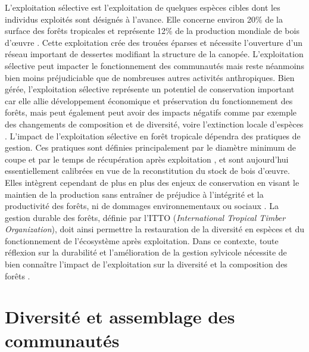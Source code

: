 \documentclass[
  11pt,
  french,
  A4paper,
  extrafontsizes,onecolumn,openright
  ]{memoir}
\begin{document}
L'exploitation sélective est l'exploitation de quelques espèces cibles
dont les individus exploités sont désignés à l'avance. Elle concerne
environ 20\% de la surface des forêts tropicales et représente 12\% de
la production mondiale de bois d'œuvre \autocite{Martin2015}. Cette
exploitation crée des trouées éparses et nécessite l'ouverture d'un
réseau important de dessertes modifiant la structure de la canopée.
L'exploitation sélective peut impacter le fonctionnement des communautés
mais reste néanmoins bien moins préjudiciable que de nombreuses autres
activités anthropiques. Bien gérée, l'exploitation sélective représente
un potentiel de conservation important car elle allie développement
économique et préservation du fonctionnement des forêts, mais peut
également peut avoir des impacts négatifs comme par exemple des
changements de composition et de diversité, voire l'extinction locale
d'espèces \autocite{Gibson2011}. L'impact de l'exploitation sélective en
forêt tropicale dépendra des pratiques de gestion. Ces pratiques sont
définies principalement par le diamètre minimum de coupe et par le temps
de récupération après exploitation \autocite{Sist2015}, et sont
aujourd'hui essentiellement calibrées en vue de la reconstitution du
stock de bois d'œuvre. Elles intègrent cependant de plus en plus des
enjeux de conservation en visant le maintien de la production sans
entraîner de préjudice à l'intégrité et la productivité des forêts, ni
de dommages environnementaux ou sociaux \autocite{ITTO2005}. La gestion
durable des forêts, définie par l'ITTO (\emph{International Tropical
Timber Organization}), doit ainsi permettre la restauration de la
diversité en espèces et du fonctionnement de l'écosystème après
exploitation. Dans ce contexte, toute réflexion sur la durabilité et
l'amélioration de la gestion sylvicole nécessite de bien connaître
l'impact de l'exploitation sur la diversité et la composition des forêts
.

\section{Diversité et assemblage des
communautés}\label{diversite-et-assemblage-des-communautes}
\end{document}
